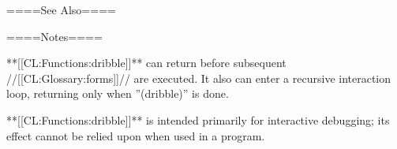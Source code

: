 ====See Also====

{\secref\PathnamesAsFilenames}

====Notes====

**[[CL:Functions:dribble]]** can return before subsequent //[[CL:Glossary:forms]]// are executed. It also can enter a recursive interaction loop, returning only when ''(dribble)'' is done.

**[[CL:Functions:dribble]]** is intended primarily for interactive debugging; its effect cannot be relied upon when used in a program.

      
